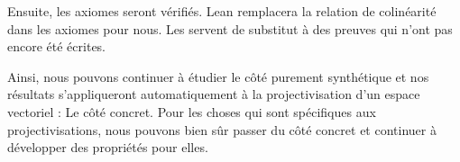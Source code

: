 \documentclass[10pt, oneside]{memoir}
\theoremstyle{definition}
\theoremstyle{remark}
\begin{document}
Ensuite, les axiomes seront vérifiés. Lean remplacera la relation de colinéarité
dans les axiomes pour nous. Les  servent de substitut à des preuves
qui n'ont pas encore été écrites.

Ainsi, nous pouvons continuer à étudier le côté purement synthétique et nos
résultats s'appliqueront automatiquement à la projectivisation d'un espace
vectoriel : Le côté concret. Pour les choses qui sont spécifiques aux
projectivisations, nous pouvons bien sûr passer du côté concret et continuer à
développer des propriétés pour elles.


\clearpage
\nocite{*}
\printbibliography[title=Références,heading=subbibliography]
\end{document}
